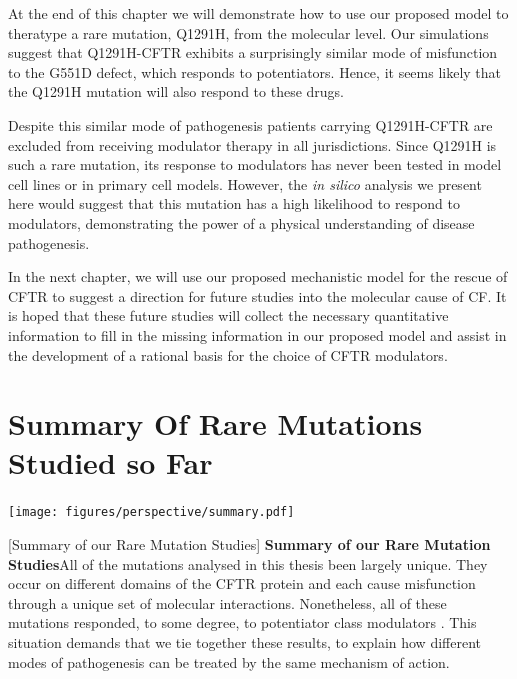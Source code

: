 At the end of this chapter we will demonstrate how to use our proposed model to theratype a rare mutation, Q1291H, from the molecular level. Our simulations suggest that Q1291H-CFTR exhibits a surprisingly similar mode of misfunction to the G551D defect, which responds to potentiators. Hence, it seems likely that the Q1291H mutation will also respond to these drugs. 

Despite this similar mode of pathogenesis patients carrying Q1291H-CFTR are excluded from receiving modulator therapy in all jurisdictions. Since Q1291H is such a rare mutation, its response to modulators has never been tested in model cell lines or in primary cell models. However, the \textit{in silico} analysis we present here would suggest that this mutation has a high likelihood to respond to modulators, demonstrating the power of a physical understanding of disease pathogenesis.

In the next chapter, we will use our proposed mechanistic model for the rescue of CFTR to suggest a direction for future studies into the molecular cause of CF. It is hoped that these future studies will collect the necessary quantitative information to fill in the missing information in our proposed model and assist in the development of a rational basis for the choice of CFTR modulators. 



\section{Summary Of Rare Mutations Studied so Far}

	\begin{center}
	  \texttt{[image: figures/perspective/summary.pdf]}
	\end{center}
\begingroup
\captionsetup{singlelinecheck = false, justification=raggedright}
[Summary of our Rare Mutation Studies] {\textbf{Summary of our Rare Mutation Studies}}{All of the mutations analysed in this thesis been largely unique. They occur on different domains of the CFTR protein and each cause misfunction through a unique set of molecular interactions. Nonetheless, all of these mutations responded, to some degree, to potentiator class modulators \cite{wong2022, wong2022a, kim2018, vanwilligen2019}. This situation demands that we tie together these results, to explain how different modes of pathogenesis can be treated by the same mechanism of action. } 
\label{summary_rare_mutations_MD}
\endgroup

